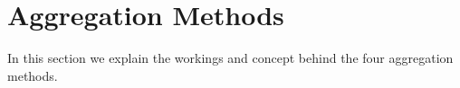 \section{Aggregation Methods}\label{sec:aggregations}
In this section we explain the workings and concept behind the four aggregation methods.



